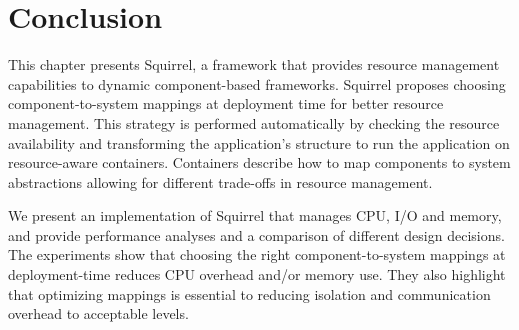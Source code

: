 
\section{Conclusion} \label{sec:conclusions}


This chapter presents Squirrel, a framework that provides resource management capabilities to dynamic component-based frameworks.
Squirrel proposes choosing component-to-system mappings at deployment time for better resource management.
This strategy is performed automatically by checking the resource availability and transforming the application's structure to run the application on resource-aware containers.
Containers describe how to map components to system abstractions
allowing for different trade-offs in resource management.

We present an implementation of Squirrel that manages CPU, I/O and memory, and provide performance analyses and a comparison of different design decisions.
The experiments
show that choosing the right component-to-system mappings at deployment-time reduces CPU overhead and/or memory use.
They also highlight that optimizing mappings is essential to reducing isolation and communication overhead to acceptable levels.

